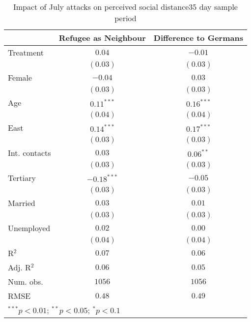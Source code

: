 
\begin{table}
\caption{Impact of July attacks on perceived social distance35 day sample period}
\begin{center}
\begin{tabular}{l c c}
\toprule
 & Refugee as Neighbour & Difference to Germans \\
\midrule
Treatment     & $0.04$        & $-0.01$      \\
              & $(0.03)$      & $(0.03)$     \\
Female        & $-0.04$       & $0.03$       \\
              & $(0.03)$      & $(0.03)$     \\
Age           & $0.11^{***}$  & $0.16^{***}$ \\
              & $(0.04)$      & $(0.04)$     \\
East          & $0.14^{***}$  & $0.17^{***}$ \\
              & $(0.03)$      & $(0.03)$     \\
Int. contacts & $0.03$        & $0.06^{**}$  \\
              & $(0.03)$      & $(0.03)$     \\
Tertiary      & $-0.18^{***}$ & $-0.05$      \\
              & $(0.03)$      & $(0.03)$     \\
Married       & $0.03$        & $0.01$       \\
              & $(0.03)$      & $(0.03)$     \\
Unemployed    & $0.02$        & $0.00$       \\
              & $(0.04)$      & $(0.04)$     \\
\midrule
R$^2$         & $0.07$        & $0.06$       \\
Adj. R$^2$    & $0.06$        & $0.05$       \\
Num. obs.     & $1056$        & $1056$       \\
RMSE          & $0.48$        & $0.49$       \\
\bottomrule
\multicolumn{3}{l}{\scriptsize{$^{***}p<0.01$; $^{**}p<0.05$; $^{*}p<0.1$}}
\end{tabular}
\label{tab_dist_35}
\end{center}
\end{table}
